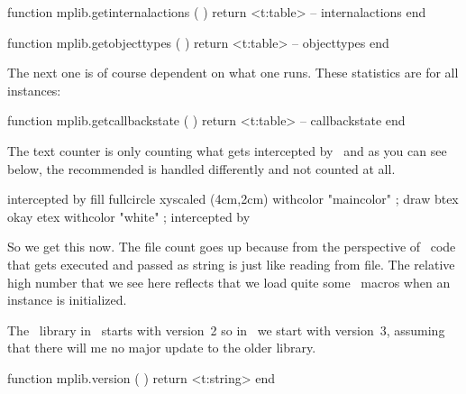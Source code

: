 \starttyping[option=LUA]
function mplib.getinternalactions ( )
    return <t:table> -- internalactions
end
\stoptyping

\startcolumns[n=4]
\stopcolumns

\starttyping[option=LUA]
function mplib.getobjecttypes ( )
    return <t:table> -- objecttypes
end
\stoptyping

\startcolumns[n=4]
\stopcolumns

The next one is of course dependent on what one runs. These statistics are for
all instances:

\starttyping[option=LUA]
function mplib.getcallbackstate ( )
    return <t:table> -- callbackstate
end
\stoptyping

\startcolumns[n=2]
\stopcolumns

The text counter is only counting what gets intercepted by \METAPOST\ and as you
can see below, the recommended  is handled differently and not
counted at all.

\startlinecorrection
{} {intercepted by \CONTEXT}
  {\startMPcode
      fill fullcircle xyscaled (4cm,2cm) withcolor "maincolor" ;
      draw btex okay etex withcolor "white" ;
   \stopMPcode} {intercepted by \METAPOST}
\stopcombination
\stoplinecorrection

So we get this now. The file count goes up because from the perspective of
\METAPOST\ code that gets executed and passed as string is just like reading from
file. The relative high number that we see here reflects that we load quite some
\METAFUN\ macros when an instance is initialized.

\startcolumns[n=3]
\stopcolumns

\stopsubsection

\startsubsection[title=Information]

The \METAPOST\ library in \LUATEX\ starts with version~2 so in \LUAMETATEX\ we
start with version~3, assuming that there will me no major update to the older
library.

\starttyping[option=LUA]
function mplib.version ( )
    return <t:string>
end
\stoptyping

